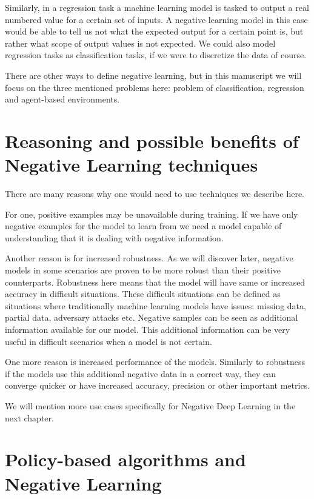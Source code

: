\documentclass[b5paper]{book}
\begin{document}
Similarly, in a regression task a machine learning model is tasked to output a real numbered value for a certain set of inputs. A negative learning model in this case would be able to tell us not what the expected output for a certain point is, but rather what scope of output values is not expected. We could also model regression tasks as classification tasks, if we were to discretize the data of course.

There are other ways to define negative learning, but in this manuscript we will focus on the three mentioned problems here: problem of classification, regression and agent-based environments.

\section{Reasoning and possible benefits of Negative Learning techniques}

There are many reasons why one would need to use techniques we describe here. 

For one, positive examples may be unavailable during training. If we have only negative examples for the model to learn from we need a model capable of understanding that it is dealing with negative information.

Another reason is for increased robustness. As we will discover later, negative models in some scenarios are proven to be more robust than their positive counterparts. Robustness here means that the model will have same or increased accuracy in difficult situations. These difficult situations can be defined as situations where traditionally machine learning models have issues: missing data, partial data, adversary attacks etc. Negative samples can be seen as additional information available for our model. This additional information can be very useful in difficult scenarios when a model is not certain. 

One more reason is increased performance of the models. Similarly to robustness if the models use this additional negative data in a correct way, they can converge quicker or have increased accuracy, precision or other important metrics.

We will mention more use cases specifically for Negative Deep Learning in the next chapter.

\section{Policy-based algorithms and Negative Learning}
\end{document}
